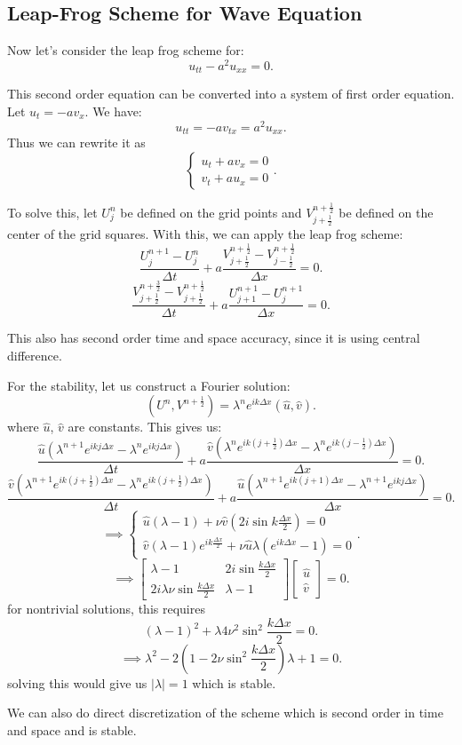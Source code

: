 \documentclass[../main/main.tex]{subfiles}
\begin{document}
\subsection{Leap-Frog Scheme for Wave Equation}
Now let's consider the leap frog scheme for:
\[
u_{t t } - a^2 u_{x x} = 0
.\] 
\begin{remark}
    This second order equation can be converted into a system of first order equation. Let $u_t = -av_x$. We have: \[
    u_{ t t} = -a v_{t x} = a^2u_{x x }
    .\] Thus we can rewrite it as \[
    \begin{cases}
        u_t + a v_x = 0 \\
        v_t + a u_x = 0
    \end{cases}
    .\] 
\end{remark}
To solve this, let $U_j^n$ be defined on the grid points and $V_{j+\frac{1}{2}}^{n+\frac{1}{2}}$ be defined on the center of the grid squares. With this, we can apply the leap frog scheme: \[
\frac{U_j^{n+1}-U_j^n}{\Delta t} + a \frac{V^{n+\frac{1}{2}}_{j+\frac{1}{2}}-V_{j-\frac{1}{2}}^{n+\frac{1}{2}}}{\Delta x} = 0
.\]\[ 
\frac{V^{n+\frac{3}{2}}_{j+\frac{1}{2}}-V_{j+\frac{1}{2}}^{n+\frac{1}{2}}}{\Delta t} + a\frac{U_{j+1}^{n+1}-U_j^{n+1}}{\Delta x} = 0
.\]  
\begin{remark}
    This also has second order time and space accuracy, since it is using central difference.
\end{remark}
For the stability, let us construct a Fourier solution: \[
    (U^{n},V^{n+\frac{1}{2}}) = \lambda ^{n }e^{ik \Delta x}(\hat{u},\hat{v})
.\] where $\hat{u}$, $\hat{v}$ are constants. This gives us: \[
\frac{\hat{u} (\lambda^{n+1}e^{ikj\Delta x} - \lambda^{n}e^{ikj\Delta x})}{\Delta t} + a \frac{\hat{v}(\lambda^{n}e^{ik(j+\frac{1}{2})\Delta x}- \lambda^{n}e^{ik(j-\frac{1}{2})\Delta x})}{\Delta x} = 0
.\] \[ 
\frac{\hat{v} (\lambda^{n+1}e^{ik(j+\frac{1}{2})\Delta x} - \lambda^{n}e^{ik(j+\frac{1}{2})\Delta x})}{\Delta t} + a \frac{\hat{u}(\lambda^{n+1}e^{ik(j+1)\Delta x}- \lambda^{n+1}e^{ikj\Delta x})}{\Delta x} = 0
.\] \[
\implies  
\begin{cases} 
\hat{u}(\lambda-1) + \nu \hat{v}(2i\sin k \frac{\Delta x}{2}) = 0 \\
\hat{v}(\lambda-1)e^{ik \frac{\Delta x}{2}} + \nu \hat{u} \lambda (e^{ik\Delta x}-1) = 0
\end{cases}
.\] \[
\implies \begin{bmatrix} \lambda - 1 & 2i\sin \frac{k\Delta x}{2} \\ 
2i\lambda \nu \sin \frac{k\Delta x}{2} & \lambda - 1\end{bmatrix}  \begin{bmatrix} \hat{u} \\ \hat{v} \end{bmatrix}  = 0
.\] for nontrivial solutions, this requires \[
(\lambda-1)^2 + \lambda 4 \nu^2 \sin ^2 \frac{k\Delta x }{2} = 0
.\] \[
\implies \lambda ^2 - 2(1-2\nu \sin^2 \frac{k\Delta x}{2}) \lambda + 1 = 0
.\] solving this would give us $|\lambda| = 1$ which is stable.
\begin{remark}
    We can also do direct discretization of the scheme which is second order in time and space and is stable.
\end{remark}
\end{document}
